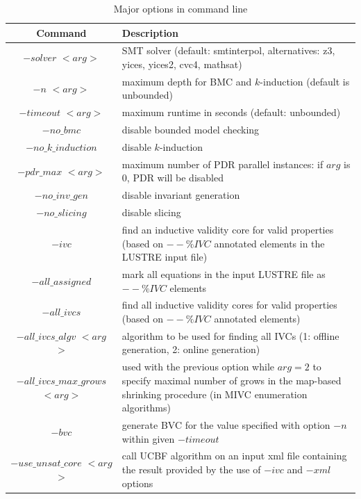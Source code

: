 \begin{table}
  \caption{Major options in \jkind command line}
   \vspace{-0.1in}
  \centering
\begin{tabularx}{\linewidth}{|c|L|}
\hline
    Command & Description\\
  \hline\hline
  $-solver $ $<$$arg$$>$ & SMT solver (default: smtinterpol, alternatives: z3, yices, yices2, cvc4, mathsat)\\[0.5ex]\hline
  $-n $ $<$$arg$$>$  & maximum depth for BMC and $k$-induction (default is unbounded) \\[0.5ex]
  $-timeout $ $<$$arg$$>$ & maximum runtime in seconds (default: unbounded)\\[0.5ex]\hline
  $-no\_bmc$ & disable bounded model checking \\[0.5ex]
  $-no\_k\_induction $ &  disable $k$-induction \\[0.5ex]
  $-pdr\_max$ $<$$arg$$>$ & maximum number of PDR parallel instances: if $arg$ is 0, PDR will be disabled \\[0.5ex]
  $-no\_inv\_gen $ & disable invariant generation \\[0.5ex]
  $-no\_slicing $ & disable slicing \\[0.5ex]\hline
  $-ivc$ & find an inductive validity core for valid properties (based on $--\%IVC$ annotated  elements in the LUSTRE input file) \\[0.5ex]
  $-all\_assigned$ & mark all equations in the input LUSTRE file as $--\%IVC$ elements \\
  $-all\_ivcs$ & find all inductive validity cores for valid  properties (based on $--\%IVC$ annotated elements) \\[0.5ex]
  $-all\_ivcs\_algv$ $<$$arg$$>$ & algorithm to be used for finding all IVCs (1: offline generation, 2: online generation) \\[0.5ex]
  $-all\_ivcs\_max\_grows$ $<$$arg$$>$ & used with the previous option while $arg = 2$ to specify maximal number of grows in the map-based  shrinking procedure (in MIVC enumeration algorithms) \\[0.5ex]
  $-bvc$ & generate BVC for the value specified with option $-n$ within given $-timeout$ \\[0.5ex]
  $-use\_unsat\_core$ $<$$arg$$>$ & call UCBF algorithm on an input xml file containing the result provided by the use of $-ivc$ and $-xml$ options\\[0.5ex]\hline

\end{tabularx}
\end{table}
